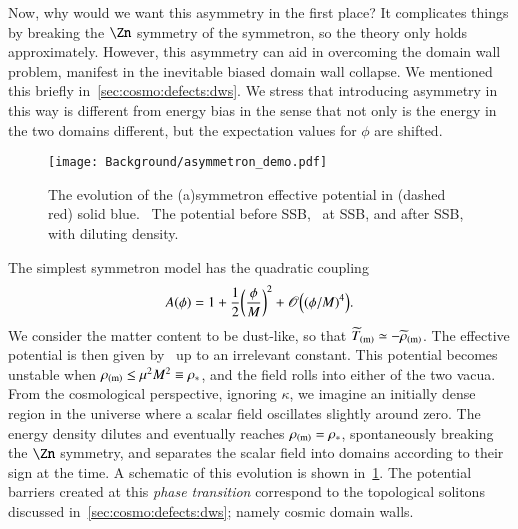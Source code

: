     Now, why would we want this asymmetry in the first place? It complicates things by breaking the $\Zn$ symmetry of the symmetron, so the theory only holds approximately. However, this asymmetry can aid in overcoming the domain wall problem, manifest in the inevitable biased domain wall collapse. We mentioned this briefly in~\cref{sec:cosmo:defects:dws}. %
    We stress that introducing asymmetry in this way is different from energy bias in the sense that not only is the energy in the two domains different, but the expectation values for $\phi$ are shifted.

    \begin{figure}[h]
        \centering
        {\texttt{[image: Background/asymmetron\_demo.pdf]}}
        \caption{The evolution of the (a)symmetron effective potential in (dashed red) solid blue. ~The potential before SSB, ~at SSB, and  after SSB, with diluting density. 
        }
        \label{fig:cosmo:quintessence:asymmetron_demo}
    \end{figure}

    The simplest symmetron model has the quadratic coupling
    \begin{equation}
        A(\phi)  = 1 +\frac{1}{2} {\left( \frac{\phi}{M} \right)}^2 + \mathscr{O}\Big( {(\phi/M)}^4 \Big).
    \end{equation}
    We consider the matter content to be dust-like, so that $\widetilde{T}_\mathrm{(m)}\simeq -\widetilde{\rho}_\mathrm{(m)}$. The effective potential is then given by~\citep{hinterbichlerSymmetronCosmology2011}
    up to an irrelevant constant. %
    This potential becomes unstable when $\rho_\mathrm{(m)}\leq \mu^2M^2\equiv \rho_\ast$, and the field rolls into either of the two vacua. From the cosmological perspective, ignoring $\kappa$, we imagine an initially dense region in the universe where a scalar field oscillates slightly around zero. The energy density dilutes and eventually reaches $\rho_\mathrm{(m)}=\rho_\ast$, spontaneously breaking the $\Zn$ symmetry, and separates the scalar field into domains according to their sign at the time. A schematic of this evolution is shown in~\cref{fig:cosmo:quintessence:asymmetron_demo}. The potential barriers created at this \emph{phase transition} correspond to the topological solitons discussed in~\cref{sec:cosmo:defects:dws}; namely cosmic domain walls.

